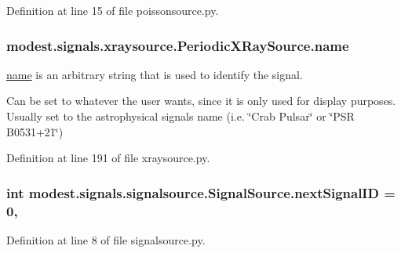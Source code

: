 Definition at line 15 of file poissonsource.\+py.

\subsubsection[{\texorpdfstring{name}{name}}]{\setlength{\rightskip}{0pt plus 5cm}modest.\+signals.\+xraysource.\+Periodic\+X\+Ray\+Source.\+name}\hypertarget{classmodest_1_1signals_1_1xraysource_1_1PeriodicXRaySource_aac8308319d4f31067e1087660a15db03}{}\label{classmodest_1_1signals_1_1xraysource_1_1PeriodicXRaySource_aac8308319d4f31067e1087660a15db03}


\hyperlink{classmodest_1_1signals_1_1xraysource_1_1PeriodicXRaySource_aac8308319d4f31067e1087660a15db03}{name} is an arbitrary string that is used to identify the signal. 

Can be set to whatever the user wants, since it is only used for display purposes. Usually set to the astrophysical signal\textquotesingle{}s name (i.\+e. \char`\"{}\+Crab Pulsar\char`\"{} or \char`\"{}\+P\+S\+R B0531+21\char`\"{}) 

Definition at line 191 of file xraysource.\+py.

\subsubsection[{\texorpdfstring{next\+Signal\+ID}{nextSignalID}}]{\setlength{\rightskip}{0pt plus 5cm}int modest.\+signals.\+signalsource.\+Signal\+Source.\+next\+Signal\+ID = 0\hspace{0.3cm}{\ttfamily [static]}, {\ttfamily [inherited]}}\hypertarget{classmodest_1_1signals_1_1signalsource_1_1SignalSource_a453eafb550b551adbec0903deb63dfce}{}\label{classmodest_1_1signals_1_1signalsource_1_1SignalSource_a453eafb550b551adbec0903deb63dfce}


Definition at line 8 of file signalsource.\+py.

